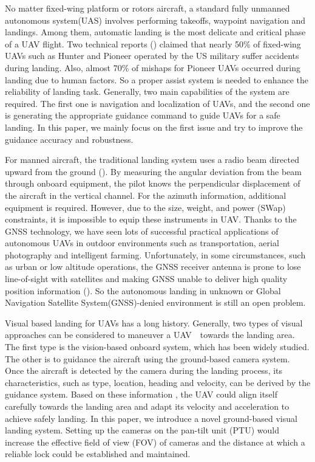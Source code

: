 No matter fixed-wing platform or rotors aircraft, a standard fully unmanned autonomous system(UAS) involves performing takeoffs, waypoint navigation and landings. Among them, automatic landing is the most delicate and critical phase of a UAV flight. Two technical reports (\cite{williams2004summary,manning2004role}) claimed that nearly 50\% of fixed-wing UAVs such as Hunter and Pioneer operated by the US military suffer accidents during landing. Also, almost 70\% of mishaps for Pioneer UAVs occurred during landing due to human factors. So a proper assist system is needed to enhance the reliability of landing task. Generally, two main capabilities of the system are required. The first one is navigation and localization of UAVs, and the second one is generating the appropriate guidance command to guide UAVs for a safe landing. In this paper, we mainly focus on the first issue and try to improve the guidance accuracy and robustness.


For manned aircraft, the traditional landing system uses a radio beam directed upward from the ground (\cite{mclean1990automatic, stevens2003aircraft}). By measuring the angular deviation from the beam through onboard equipment, the pilot knows the perpendicular displacement of the aircraft in the vertical channel. For the azimuth information, additional equipment is required. However, due to the size, weight, and power (SWap) constraints, it is impossible to equip these instruments in UAV. Thanks to the GNSS technology, we have seen lots of successful practical applications of autonomous UAVs in outdoor environments such as transportation, aerial photography and intelligent farming. Unfortunately, in some circumstances, such as urban or low altitude operations, the GNSS receiver antenna is prone to lose line-of-sight with satellites and making GNSS unable to deliver high quality position information (\cite{farrell1998gps}). So the autonomous landing in unknown or Global Navigation Satellite System(GNSS)-denied environment is still an open problem. 

Visual based landing for UAVs has a long history. Generally, two types of visual approaches can be considered to maneuver a UAV　towards the landing area. The first type is the vision-based onboard system, which has been widely studied. The other is to guidance the aircraft using the ground-based camera system. Once the aircraft is detected by the camera during the landing process, its characteristics, such as type, location, heading and velocity, can be derived by the guidance system. Based on these information , the UAV could align itself carefully towards the landing area and adapt its velocity and acceleration to achieve safely landing. In this paper, we introduce a novel ground-based visual landing system. Setting up the cameras on the pan-tilt unit (PTU) would increase the effective field of view (FOV) of cameras and the distance at which a reliable lock could be established and maintained. 


